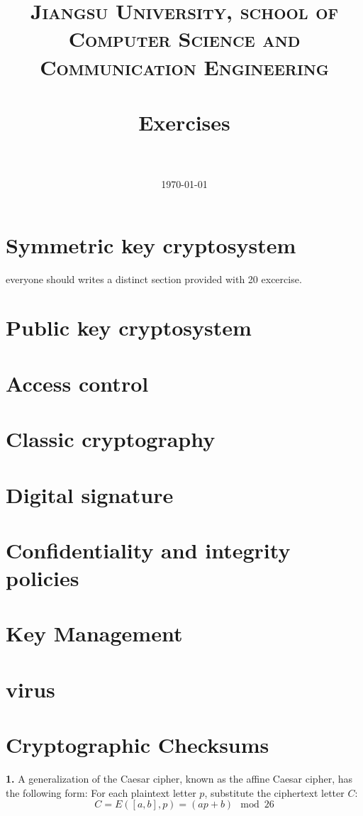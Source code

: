 \documentclass[paper=a4, fontsize=11pt]{scrartcl} %
\title{ 
\normalfont \normalsize
\textsc{Jiangsu University, school of Computer Science and Communication Engineering} \\ [25pt] %
\horrule{0.5pt} \\[0.4cm] %
\huge Exercises \\ %
\horrule{2pt} \\[0.5cm] %
}
\date{\normalsize\today} %
\numberwithin{equation}{section} %
\numberwithin{figure}{section} %
\numberwithin{table}{section} %
\begin{document}
\maketitle %

\section{Symmetric key cryptosystem}
\label{sec:skc}
everyone should writes a distinct section provided with 20 excercise.
\section{Public key cryptosystem}
\label{sec:pkc}

\section{Access control}

\section{Classic cryptography}
\label{sec:cc}

\section{Digital signature}
\label{sec:ds}

\section{Confidentiality and integrity policies}

\section{Key Management}
\label{sec:km}

\section{virus}
\label{sec:vs}

\section{Cryptographic Checksums}
\label{sec:checksums}


\textbf{1.} A generalization of the Caesar cipher, known as the affine Caesar cipher, has the following form: For each plaintext letter $p$, substitute the ciphertext letter $C$:
$$C = E([a, b], p) = (ap + b) \mod 26$$
\end{document}
